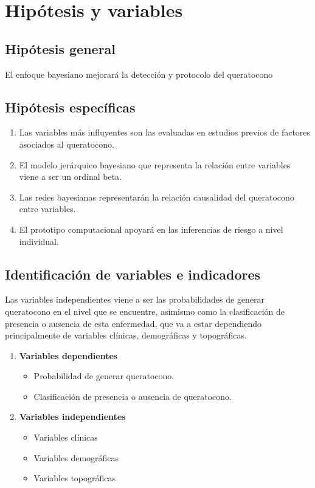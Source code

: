 \section{Hipótesis y variables}
\subsection{Hipótesis general}
El enfoque bayesiano mejorará la detección y protocolo del queratocono

\subsection{Hipótesis específicas}
\begin{enumerate}
    \item Las variables más influyentes son las evaluadas en estudios previos de factores asociados al queratocono.
    \item El modelo jerárquico bayesiano que representa la relación entre variables viene a ser un ordinal beta.
    \item Las redes bayesianas representarán la relación causalidad del queratocono entre variables.
    \item El prototipo computacional apoyará en las inferencias de riesgo a nivel individual.
\end{enumerate}

\subsection{Identificación de variables e indicadores}
Las variables independientes viene a ser las probabilidades de generar queratocono en el nivel que se encuentre, asimismo como la clasificación de presencia o ausencia de esta enfermedad, que va a estar dependiendo principalmente de variables clínicas, demográficas y topográficas.

\begin{enumerate}
    \item \textbf{Variables dependientes}
    \begin{itemize}
        \item Probabilidad de generar queratocono.
        \item Clasificación de presencia o ausencia de queratocono. 
    \end{itemize}
    \item \textbf{Variables independientes} 
    \begin{itemize}
        \item Variables clínicas
        \item Variables demográficas
        \item Variables topográficas 
    \end{itemize}
\end{enumerate}


